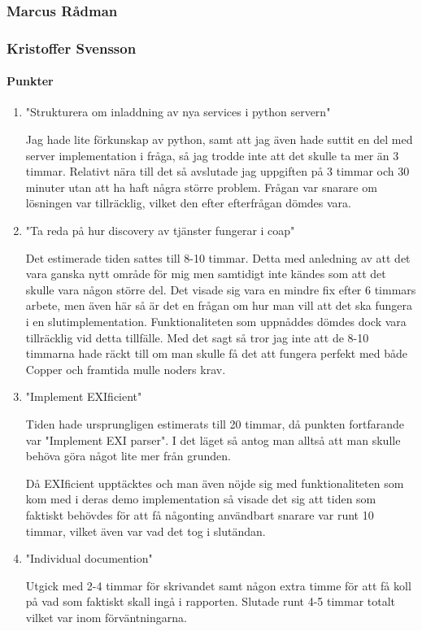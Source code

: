 \subsubsection{Marcus Rådman}
\subsubsection{Kristoffer Svensson}
\paragraph{Punkter}
\begin{enumerate}
\item{"Strukturera om inladdning av nya services i python servern"}

Jag hade lite förkunskap av python, samt att jag även hade suttit en del med server implementation i fråga, så jag trodde inte att det skulle ta mer än 3 timmar. 
Relativt nära till det så avslutade jag uppgiften på 3 timmar och 30 minuter utan att ha haft några större problem. Frågan var snarare om lösningen var tillräcklig, vilket
den efter efterfrågan dömdes vara.

\item {"Ta reda på hur discovery av tjänster fungerar i coap"}

Det estimerade tiden sattes till 8-10 timmar. Detta med anledning av att det vara ganska nytt område för mig men samtidigt inte kändes som att det skulle vara någon
större del. Det visade sig vara en mindre fix efter 6 timmars arbete, men även här så är det en frågan om hur man vill att det ska fungera i en slutimplementation. 
Funktionaliteten som uppnåddes dömdes dock vara tillräcklig vid detta tillfälle. Med det sagt så tror jag inte att de 8-10 timmarna hade räckt till om man skulle få
det att fungera perfekt med både Copper och framtida mulle noders krav.

\item {"Implement EXIficient"}

Tiden hade ursprungligen estimerats till 20 timmar, då punkten fortfarande var "Implement EXI parser". I det läget så antog man alltså att man skulle behöva göra något lite
mer från grunden. 

Då EXIficient upptäcktes och man även nöjde sig med funktionaliteten som kom med i deras demo implementation så visade det sig att tiden som faktiskt behövdes för
att få någonting användbart snarare var runt 10 timmar, vilket även var vad det tog i slutändan.

\item {"Individual documention"}

Utgick med 2-4 timmar för skrivandet samt någon extra timme för att få koll på vad som faktiskt skall ingå i rapporten. Slutade runt 4-5 timmar totalt vilket var inom förväntningarna.

\end{enumerate}

